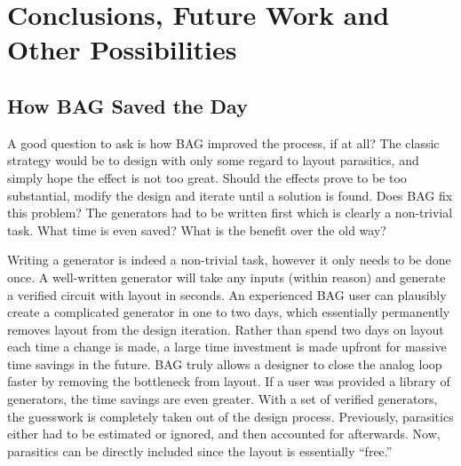\chapter{Conclusions, Future Work and Other Possibilities}

\section{How BAG Saved the Day}
A good question to ask is how BAG improved the process, if at all? The classic strategy would be to design with only some regard to layout parasitics, and simply hope the effect is not too great. Should the effects prove to be too substantial, modify the design and iterate until a solution is found. Does BAG fix this problem? The generators had to be written first which is clearly a non-trivial task. What time is even saved? What is the benefit over the old way? 

Writing a generator is indeed a non-trivial task, however it only needs to be done once. A well-written generator will take any inputs (within reason) and generate a verified circuit with layout in seconds. An experienced BAG user can plausibly create a complicated generator in one to two days, which essentially permanently removes layout from the design iteration. Rather than spend two days on layout each time a change is made, a large time investment is made upfront for massive time savings in the future. BAG truly allows a designer to close the analog loop faster by removing the bottleneck from layout. If a user was provided a library of generators, the time savings are even greater. With a set of verified generators, the guesswork is completely taken out of the design process. Previously, parasitics either had to be estimated or ignored, and then accounted for afterwards. Now, parasitics can be directly included since the layout is essentially ``free.'' 

